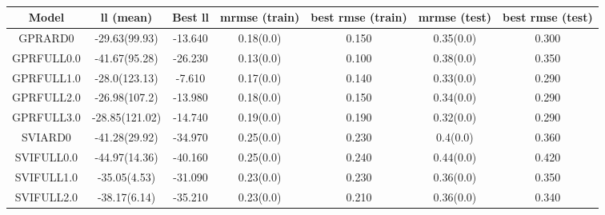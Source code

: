 \begin{table}
	\begin{center}
		\begin{tabular}{|c|c|c|c|c|c|c|}
			\hline
			Model & ll (mean) & Best ll & mrmse (train) & best rmse (train) & mrmse (test) & best rmse (test) \\
			\hline
			GPRARD0 & -29.63(99.93) & -13.640 & 0.18(0.0) & 0.150 & 0.35(0.0) & 0.300 \\
			\hline
			GPRFULL0.0 & -41.67(95.28) & -26.230 & 0.13(0.0) & 0.100 & 0.38(0.0) & 0.350 \\
			\hline
			GPRFULL1.0 & -28.0(123.13) & -7.610 & 0.17(0.0) & 0.140 & 0.33(0.0) & 0.290 \\
			\hline
			GPRFULL2.0 & -26.98(107.2) & -13.980 & 0.18(0.0) & 0.150 & 0.34(0.0) & 0.290 \\
			\hline
			GPRFULL3.0 & -28.85(121.02) & -14.740 & 0.19(0.0) & 0.190 & 0.32(0.0) & 0.290 \\
			\hline
			SVIARD0 & -41.28(29.92) & -34.970 & 0.25(0.0) & 0.230 & 0.4(0.0) & 0.360 \\
			\hline
			SVIFULL0.0 & -44.97(14.36) & -40.160 & 0.25(0.0) & 0.240 & 0.44(0.0) & 0.420 \\
			\hline
			SVIFULL1.0 & -35.05(4.53) & -31.090 & 0.23(0.0) & 0.230 & 0.36(0.0) & 0.350 \\
			\hline
			SVIFULL2.0 & -38.17(6.14) & -35.210 & 0.23(0.0) & 0.210 & 0.36(0.0) & 0.340 \\
			\hline
		\end{tabular}
	\end{center}
	\caption{}
\end{table}